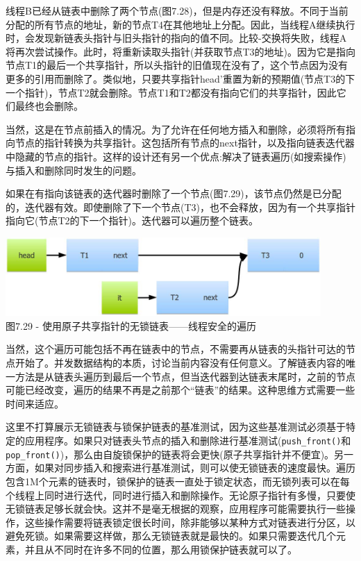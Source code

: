 线程B已经从链表中删除了两个节点(图7.28)，但是内存还没有释放。不同于当前分配的所有节点的地址，新的节点T4在其他地址上分配。因此，当线程A继续执行时，会发现新链表头指针与旧头指针的指向的值不同。比较-交换将失败，线程A将再次尝试操作。此时，将重新读取头指针(并获取节点T3的地址)。因为它是指向节点T1的最后一个共享指针，所以头指针的旧值现在没有了，这个节点因为没有更多的引用而删除了。类似地，只要共享指针head'重置为新的预期值(节点T3的下一个指针)，节点T2就会删除。节点T1和T2都没有指向它们的共享指针，因此它们最终也会删除。

当然，这是在节点前插入的情况。为了允许在任何地方插入和删除，必须将所有指向节点的指针转换为共享指针。这包括所有节点的next指针，以及指向链表迭代器中隐藏的节点的指针。这样的设计还有另一个优点:解决了链表遍历(如搜索操作)与插入和删除同时发生的问题。

如果在有指向该链表的迭代器时删除了一个节点(图7.29)，该节点仍然是已分配的，迭代器有效。即使删除了下一个节点(T3)，也不会释放，因为有一个共享指针指向它(节点T2的下一个指针)。迭代器可以遍历整个链表。

\begin{center}
\includegraphics[width=0.9\textwidth]{content/2/chapter7/images/29.jpg}\\
图7.29 - 使用原子共享指针的无锁链表——线程安全的遍历
\end{center}

当然，这个遍历可能包括不再在链表中的节点，不需要再从链表的头指针可达的节点开始了。并发数据结构的本质，讨论当前内容没有任何意义。了解链表内容的唯一方法是从链表头遍历到最后一个节点，但当迭代器到达链表末尾时，之前的节点可能已经改变，遍历的结果不再是之前那个“链表”的结果。这种思维方式需要一些时间来适应。

这里不打算展示无锁链表与锁保护链表的基准测试，因为这些基准测试必须基于特定的应用程序。如果只对链表头节点的插入和删除进行基准测试(\texttt{push\_front()}和\texttt{pop\_front()})，那么由自旋锁保护的链表将会更快(原子共享指针并不便宜)。另一方面，如果对同步插入和搜索进行基准测试，则可以使无锁链表的速度最快。遍历包含1M个元素的链表时，锁保护的链表一直处于锁定状态，而无锁列表可以在每个线程上同时进行迭代，同时进行插入和删除操作。无论原子指针有多慢，只要使无锁链表足够长就会快。这并不是毫无根据的观察，应用程序可能需要执行一些操作，这些操作需要将链表锁定很长时间，除非能够以某种方式对链表进行分区，以避免死锁。如果需要这样做，那么无锁链表就是最快的。如果只需要迭代几个元素，并且从不同时在许多不同的位置，那么用锁保护链表就可以了。

